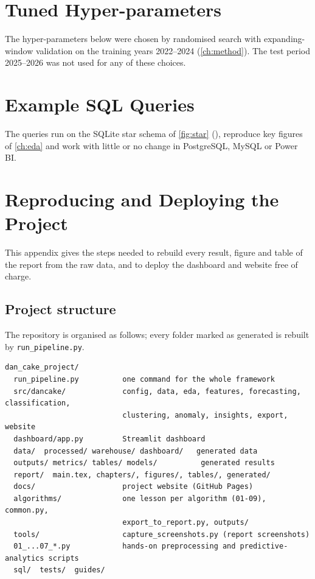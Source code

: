 \chapter{Tuned Hyper-parameters}\label{app:hyper}
The hyper-parameters below were chosen by randomised search with expanding-window validation on the training
years 2022--2024 (\cref{ch:method}). The test period 2025--2026 was not used for any of these choices.



\chapter{Example SQL Queries}\label{app:sql}
The queries run on the SQLite star schema of \cref{fig:star} (), reproduce key
figures of \cref{ch:eda} and work with little or no change in PostgreSQL, MySQL or Power BI.

\begingroup{}

\endgroup

\chapter{Reproducing and Deploying the Project}\label{app:reproduce}
This appendix gives the steps needed to rebuild every result, figure and table of the report from the raw data,
and to deploy the dashboard and website free of charge.

\section{Project structure}\label{app:structure}
The repository is organised as follows; every folder marked as generated is rebuilt by \texttt{run\_pipeline.py}.
\begin{lstlisting}
dan_cake_project/
  run_pipeline.py          one command for the whole framework
  src/dancake/             config, data, eda, features, forecasting, classification,
                           clustering, anomaly, insights, export, website
  dashboard/app.py         Streamlit dashboard
  data/  processed/ warehouse/ dashboard/   generated data
  outputs/ metrics/ tables/ models/          generated results
  report/  main.tex, chapters/, figures/, tables/, generated/
  docs/                    project website (GitHub Pages)
  algorithms/              one lesson per algorithm (01-09), common.py,
                           export_to_report.py, outputs/
  tools/                   capture_screenshots.py (report screenshots)
  01_...07_*.py            hands-on preprocessing and predictive-analytics scripts
  sql/  tests/  guides/
\end{lstlisting}


